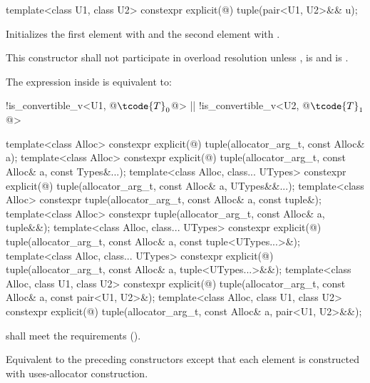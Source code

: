 %
%
\begin{itemdecl}
template<class U1, class U2> constexpr explicit(@\seebelow@) tuple(pair<U1, U2>&& u);
\end{itemdecl}

\begin{itemdescr}
\pnum
\effects
Initializes the first element with
 and the
second element with .

\pnum
\remarks
This constructor shall not participate in overload resolution unless
,
 is  and
 is .

\pnum
The expression inside  is equivalent to:
\begin{codeblock}
!is_convertible_v<U1, @$\tcode{T}_0$@> || !is_convertible_v<U2, @$\tcode{T}_1$@>
\end{codeblock}
\end{itemdescr}

%
\begin{itemdecl}
template<class Alloc>
  constexpr explicit(@\seebelow@)
    tuple(allocator_arg_t, const Alloc& a);
template<class Alloc>
  constexpr explicit(@\seebelow@)
    tuple(allocator_arg_t, const Alloc& a, const Types&...);
template<class Alloc, class... UTypes>
  constexpr explicit(@\seebelow@)
    tuple(allocator_arg_t, const Alloc& a, UTypes&&...);
template<class Alloc>
  constexpr tuple(allocator_arg_t, const Alloc& a, const tuple&);
template<class Alloc>
  constexpr tuple(allocator_arg_t, const Alloc& a, tuple&&);
template<class Alloc, class... UTypes>
  constexpr explicit(@\seebelow@)
    tuple(allocator_arg_t, const Alloc& a, const tuple<UTypes...>&);
template<class Alloc, class... UTypes>
  constexpr explicit(@\seebelow@)
    tuple(allocator_arg_t, const Alloc& a, tuple<UTypes...>&&);
template<class Alloc, class U1, class U2>
  constexpr explicit(@\seebelow@)
    tuple(allocator_arg_t, const Alloc& a, const pair<U1, U2>&);
template<class Alloc, class U1, class U2>
  constexpr explicit(@\seebelow@)
    tuple(allocator_arg_t, const Alloc& a, pair<U1, U2>&&);
\end{itemdecl}

\begin{itemdescr}
\pnum
\requires {} shall meet the
 requirements ().

\pnum
\effects
Equivalent to the preceding constructors except that each element is constructed with
uses-allocator construction.
\end{itemdescr}

